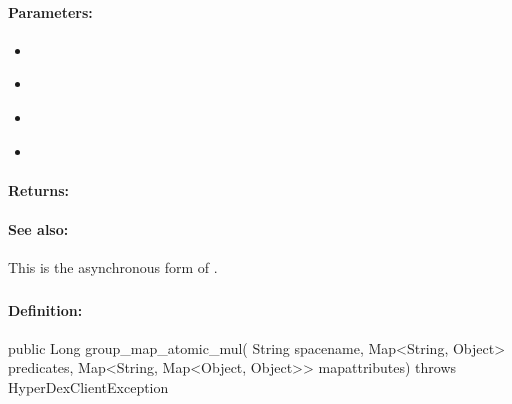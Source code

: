 \paragraph{Parameters:}
\begin{itemize}[noitemsep]
\item {}\\

\item {}\\

\item {}\\

\item {}\\

\end{itemize}

\paragraph{Returns:}


\paragraph{See also:}  This is the asynchronous form of .

\pagebreak
\subsubsection{}
\label{api:java:group_map_atomic_mul}


\paragraph{Definition:}
\begin{javacode}
public Long group_map_atomic_mul(
        String spacename,
        Map<String, Object> predicates,
        Map<String, Map<Object, Object>> mapattributes) throws HyperDexClientException
\end{javacode}

